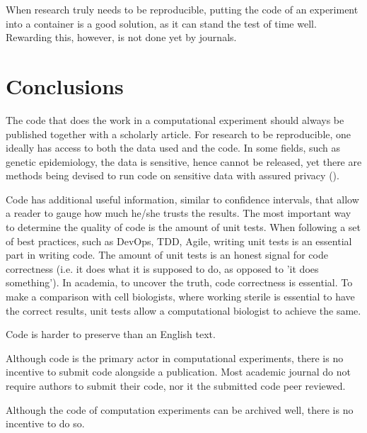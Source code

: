 
When research truly needs to be reproducible, putting the code 
of an experiment into a container is a good solution, as it 
can stand the test of time well. Rewarding this, however, is not
done yet by journals.

\section{Conclusions}

The code that does the work in a computational experiment should
always be published together with a scholarly article.
For research to be reproducible, one ideally has access to
both the data used and the code.
In some fields, such as genetic epidemiology, the data is
sensitive, hence cannot be released,
yet there are methods being devised to run code on sensitive
data with assured privacy (\cite{zhang2016review,azencott2018machine}).

Code has additional useful information, similar to confidence intervals,
that allow a reader to gauge how much he/she trusts the results.
The most important way to determine the quality of code
is the amount of unit tests.
When following a set of best practices, such as DevOps, TDD, Agile,
writing unit tests is an essential 
part in writing code.
The amount of unit tests is an honest signal 
for code correctness (i.e. it does what it is supposed to do, as opposed
to 'it does something').
In academia, to uncover the truth, code correctness is essential.
To make a comparison with cell biologists, where working
sterile is essential to have the correct results,
unit tests allow a computational biologist to achieve the same.

Code is harder to preserve than an English text.

Although code is the primary actor in computational experiments,
there is no incentive to submit code alongside a publication.
Most academic journal do not require authors to submit their code,
nor it the submitted code peer reviewed.

Although the code of computation experiments can be archived well, 
there is no incentive to do so.

